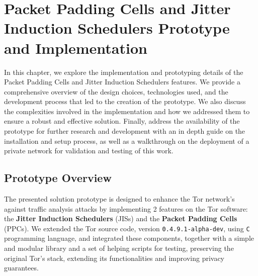 
%

\chapter{Packet Padding Cells and Jitter Induction Schedulers Prototype and Implementation}\label{cha:implementation}

In this chapter, we explore the implementation and prototyping details of the Packet Padding Cells and Jitter Induction Schedulers features. We provide a comprehensive overview of the design choices, technologies used, and the development process that led to the creation of the prototype. We also discuss the complexities involved in the implementation and how we addressed them to ensure a robust and effective solution.
Finally, address the availability of the prototype for further research and development with an in depth guide on the installation and setup process, as well as a walkthrough on the deployment of a private network for validation and testing of this work.

\section{Prototype Overview}\label{sec:prototype_overview}

The presented solution prototype is designed to enhance the Tor network's against traffic analysis attacks by implementing 2 features on the Tor software: the \textbf{Jitter Induction Schedulers} (JISs) and the \textbf{Packet Padding Cells} (PPCs). We extended the Tor source code, version \texttt{0.4.9.1-alpha-dev}, using \texttt{C} programming language, and integrated these components, together with a simple and modular library and a set of helping scripts for testing, preserving the original Tor's stack, extending its functionalities and improving privacy guarantees.

